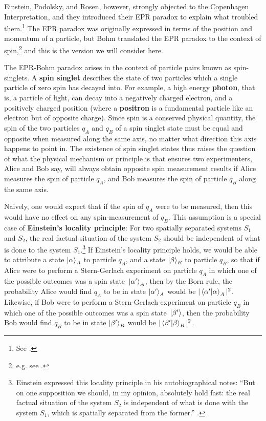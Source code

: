 Einstein, Podolsky, and Rosen, however, strongly objected to the Copenhagen Interpretation, and they introduced their EPR paradox to explain what troubled them.\footnote{See \cite{EinsteinPodolskyRosen}.} The EPR paradox was originally expressed in terms of the position and momentum of a particle, but Bohm translated the EPR paradox to the context of spin,\footnote{e.g. see \cite[p. 29, Ch. 5 sec. 3, and Ch. 22 sec. 19]{BohmQuantumTheory}. } and this is the version we will consider here.   

The EPR-Bohm paradox arises in the context of particle pairs known as spin-singlets. A \textbf{spin singlet} describes the state of two particles which a single particle of zero spin has decayed into. For example, a high energy \textbf{photon}, that is, a particle of light, can decay into a negatively charged electron, and a positively charged position (where a \textbf{positron} is a fundamental particle like an electron but of opposite charge). Since spin is a conserved physical quantity, the spin of the two particles $q_A$ and $q_B$ of a spin singlet state must be equal and opposite when measured along the same axis, no matter what direction this axis happens to point in. The existence of spin singlet states thus raises the question of what the physical mechanism or principle is that ensures two experimenters, Alice and Bob say, will always obtain opposite spin measurement results if Alice measures the spin of particle $q_A$, and Bob measures the spin of particle $q_B$ along the same axis. 

Naively, one would expect that if the spin of $q_A$ were to be measured, then this would have no effect on any spin-measurement of $q_B$. This assumption is a special case of \textbf{Einstein's locality principle}:\label{EinsteinLocalityPrinciple} For two spatially separated systems $S_1$ and $S_2$,  the real factual situation of the system $S_2$ should be independent of what is done to the system $S_1$.\footnote{Einstein expressed this locality principle in his autobiographical notes: ``But on one supposition we should, in my opinion, absolutely hold fast: the real factual situation of the system $S_2$ is independent of what is done with the system $S_1$, which is spatially separated from the former.'' \cite[p. 85]{EinsteinLocality}.} If Einstein's locality principle holds, we would be able to attribute a state $\ket{\alpha}_A$ to particle $q_A$, and a state $\ket{\beta}_B$ to particle $q_B$, so that if Alice were to perform a Stern-Gerlach experiment on particle $q_A$ in which one of the possible outcomes was a spin state $\ket*{\alpha'}_A$, then by the Born rule, the probability Alice would find $q_A$ to be in state $\ket{\alpha'}_A$ would be $|\ip{\alpha'}{\alpha}_A|^2$. Likewise, if Bob were to perform a Stern-Gerlach experiment on particle $q_B$ in which one of the possible outcomes was a spin state $\ket*{\beta'}$, then the probability Bob would find $q_B$ to be in state $\ket{\beta'}_B$ would be $|\ip{\beta'}{\beta}_B|^2$. 

